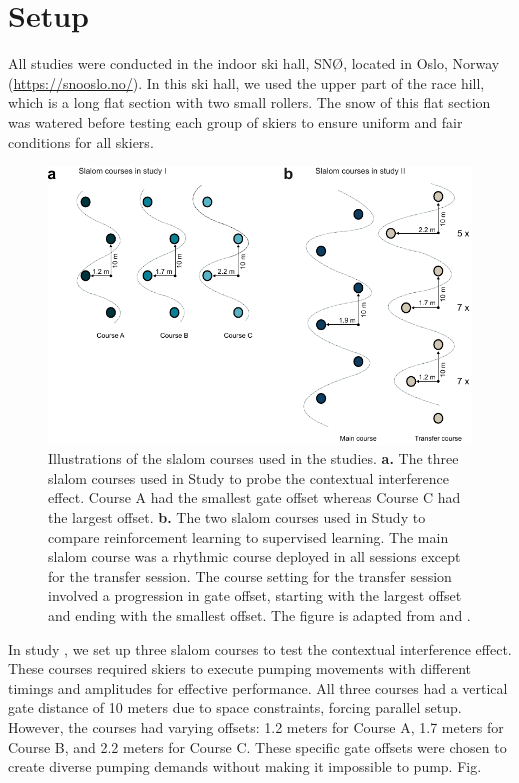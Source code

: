 \begin{figure}
\end{figure}


\section{Setup}
All studies were conducted in the indoor ski hall, SNØ, located in Oslo, Norway (\url{https://snooslo.no/}). In this ski hall, we used the upper part of the race hill, which is a long flat section with two small rollers. The snow of this flat section was watered before testing each group of skiers to ensure uniform and fair conditions for all skiers. 

\begin{figure}
    \centering
    \includegraphics[width=1\linewidth]{figure/figure_methods_courses2.pdf}
    \caption[Illustrations of the slalom courses used in the studies in  and ]{Illustrations of the slalom courses used in the studies. \textbf{a.} The three slalom courses used in Study  to probe the contextual interference effect. Course A had the smallest gate offset whereas Course C had the largest offset. \textbf{b.} The two slalom courses used in Study  to compare reinforcement learning to supervised learning. The main slalom course was a rhythmic course deployed in all sessions except for the transfer session. The course setting for the transfer session involved a progression in gate offset, starting with the largest offset and ending with the smallest offset. The figure is adapted from \textcite{magelssen_reinforcement_2024} and \textcite{magelssen_is_2022}.}
    \label{fig:slalomcourses}
\end{figure}

In study , we set up three slalom courses to test the contextual interference effect. These courses required skiers to execute pumping movements with different timings and amplitudes for effective performance. All three courses had a vertical gate distance of 10 meters due to space constraints, forcing parallel setup. However, the courses had varying offsets: 1.2 meters for Course A, 1.7 meters for Course B, and 2.2 meters for Course C. These specific gate offsets were chosen to create diverse pumping demands without making it impossible to pump. Fig. 

